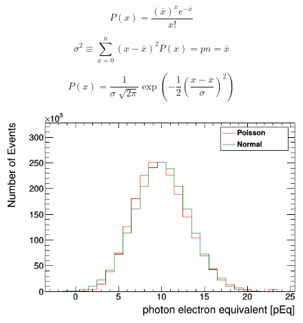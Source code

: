 \begin{equation}
P(x) = \frac{(\overline{x})^x e^{-\overline{x}}}{x!}  
\label{equ:possionExpectation}
\end{equation}

\begin{equation}
\sigma ^2 \equiv \sum_{x=0}^{n} (x-\overline{x})^2 P(x) = pn = \overline{x} 
\label{equ:possionVar}
\end{equation}

\begin{equation}
P(x) = \frac{1}{\sigma \sqrt[]{2 \pi}} \exp \left(-\frac{1}{2}\left(\frac{x-\overline{x}}{\sigma}\right)^{2}\right)
\label{equ:guassianExpectation}
\end{equation}

\begin{figure}[H]
 \centering
 \includegraphics[width=0.8\linewidth]{countingStats10.png}
 \label{fig:CoutingStats10}
\end{figure}

